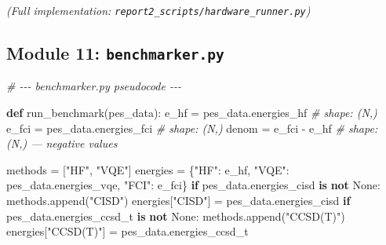 \documentclass[
  11pt,
]{report}
\newenvironment{Shaded}{}{}
\newcommand{\CommentTok}[1]{\textcolor[rgb]{0.38,0.63,0.69}{\textit{#1}}}
\newcommand{\ControlFlowTok}[1]{\textcolor[rgb]{0.00,0.44,0.13}{\textbf{#1}}}
\newcommand{\KeywordTok}[1]{\textcolor[rgb]{0.00,0.44,0.13}{\textbf{#1}}}
\newcommand{\NormalTok}[1]{#1}
\newcommand{\OperatorTok}[1]{\textcolor[rgb]{0.40,0.40,0.40}{#1}}
\newcommand{\StringTok}[1]{\textcolor[rgb]{0.25,0.44,0.63}{#1}}
\newcommand{\VariableTok}[1]{\textcolor[rgb]{0.10,0.09,0.49}{#1}}
\begin{document}
\emph{(Full implementation:
\texttt{report2\_scripts/hardware\_runner.py})}

\subsection{\texorpdfstring{Module 11:
\texttt{benchmarker.py}}{Module 11: benchmarker.py}}\label{module-11-benchmarker.py}

\begin{Shaded}
\begin{Highlighting}[]
\CommentTok{\# {-}{-}{-} benchmarker.py pseudocode {-}{-}{-}}

\KeywordTok{def}\NormalTok{ run\_benchmark(pes\_data):}
\NormalTok{    e\_hf  }\OperatorTok{=}\NormalTok{ pes\_data.energies\_hf       }\CommentTok{\# shape: (N,)}
\NormalTok{    e\_fci }\OperatorTok{=}\NormalTok{ pes\_data.energies\_fci      }\CommentTok{\# shape: (N,)}
\NormalTok{    denom }\OperatorTok{=}\NormalTok{ e\_fci }\OperatorTok{{-}}\NormalTok{ e\_hf               }\CommentTok{\# shape: (N,) — negative values}

\NormalTok{    methods }\OperatorTok{=}\NormalTok{ [}\StringTok{"HF"}\NormalTok{, }\StringTok{"VQE"}\NormalTok{]}
\NormalTok{    energies }\OperatorTok{=}\NormalTok{ \{}\StringTok{"HF"}\NormalTok{: e\_hf, }\StringTok{"VQE"}\NormalTok{: pes\_data.energies\_vqe, }\StringTok{"FCI"}\NormalTok{: e\_fci\}}
    \ControlFlowTok{if}\NormalTok{ pes\_data.energies\_cisd }\KeywordTok{is} \KeywordTok{not} \VariableTok{None}\NormalTok{:}
\NormalTok{        methods.append(}\StringTok{"CISD"}\NormalTok{)}
\NormalTok{        energies[}\StringTok{"CISD"}\NormalTok{] }\OperatorTok{=}\NormalTok{ pes\_data.energies\_cisd}
    \ControlFlowTok{if}\NormalTok{ pes\_data.energies\_ccsd\_t }\KeywordTok{is} \KeywordTok{not} \VariableTok{None}\NormalTok{:}
\NormalTok{        methods.append(}\StringTok{"CCSD(T)"}\NormalTok{)}
\NormalTok{        energies[}\StringTok{"CCSD(T)"}\NormalTok{] }\OperatorTok{=}\NormalTok{ pes\_data.energies\_ccsd\_t}


\end{Highlighting}
\end{Shaded}
\end{document}
